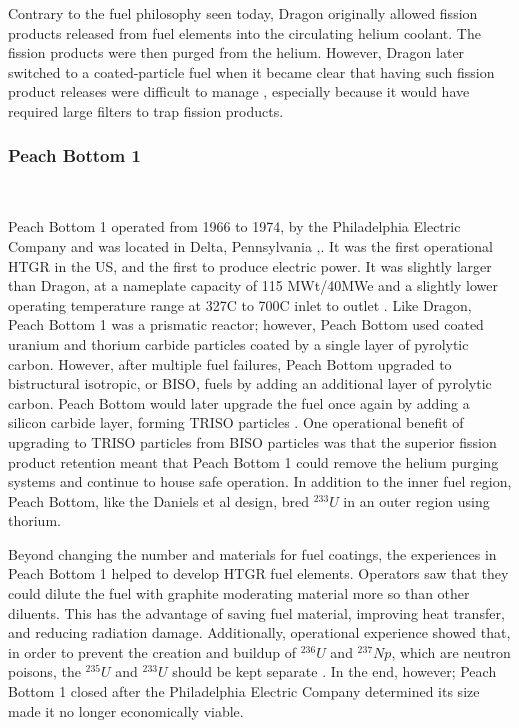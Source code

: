 Contrary to the fuel philosophy seen today, Dragon originally allowed fission products released from fuel elements into the circulating helium coolant.  The fission products were then purged from the helium.  However, Dragon later switched to a coated-particle fuel when it became clear that having such fission product releases were difficult to manage \cite{simnad_early_1991}, especially because it would have required large filters to trap fission products.

\subsubsection{Peach Bottom 1}\
\label{peach}

Peach Bottom 1 operated from 1966 to 1974, by the Philadelphia Electric Company and was located in Delta, Pennsylvania \cite{beck_high_nodate},\cite{noauthor_peach_nodate}.  It was the first operational HTGR in the US, and the first to produce electric power.  It was slightly larger than Dragon, at a nameplate capacity of 115 MWt/40MWe and a slightly lower operating temperature range at 327\textdegree  C to 700\textdegree  C inlet to outlet \cite{beck_high_nodate}.  Like Dragon, Peach Bottom 1 was a prismatic reactor; however, Peach Bottom used coated uranium and thorium carbide particles coated by a single layer of pyrolytic carbon.  However, after multiple fuel failures, Peach Bottom upgraded to bistructural isotropic, or BISO, fuels by adding an additional layer of pyrolytic carbon.  Peach Bottom would later upgrade the fuel once again by adding a silicon carbide layer, forming TRISO particles \cite{beck_high_nodate}.  One operational benefit of upgrading to TRISO particles from BISO particles was that the superior fission product retention meant that Peach Bottom 1 could remove the helium purging systems and continue to house safe operation.  In addition to the inner fuel region, Peach Bottom, like the Daniels et al design, bred $^{233}U$ in an outer region using thorium.

Beyond changing the number and materials for fuel coatings, the experiences in Peach Bottom 1 helped to develop HTGR fuel elements.  Operators saw that they could dilute the fuel with graphite moderating material more so than other diluents.  This has the advantage of saving fuel material, improving heat transfer, and reducing radiation damage.  Additionally, operational experience showed that, in order to prevent the creation and buildup of $^{236}U$ and $^{237}Np$, which are neutron poisons, the $^{235}U$ and $^{233}U$ should be kept separate \cite{simnad_early_1991}.  In the end, however; Peach Bottom 1 closed after the Philadelphia Electric Company determined its size made it no longer economically viable.

